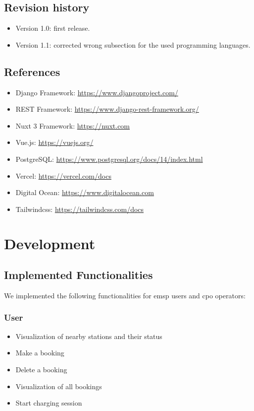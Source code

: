 \documentclass[table, 12pt]{article}
\begin{document}
\subsection{Revision history}
\begin{itemize}
    \item Version 1.0: first release.
    \item Version 1.1: corrected wrong subsection for the used programming languages.
    
\end{itemize}

\subsection{References}
\begin{itemize}
    \item Django Framework: \url{https://www.djangoproject.com/}
    \item REST Framework: \url{https://www.django-rest-framework.org/}
    \item Nuxt 3 Framework: \url{https://nuxt.com}
    \item Vue.js: \url{https://vuejs.org/}
    \item PostgreSQL: \url{https://www.postgresql.org/docs/14/index.html}
    \item Vercel: \url{https://vercel.com/docs}
    \item Digital Ocean: \url{https://www.digitalocean.com}
    \item Tailwindcss: \url{https://tailwindcss.com/docs}
\end{itemize}

\newpage
\section{Development}
\subsection{Implemented Functionalities}
We implemented the following functionalities for emsp users and cpo operators:

\subsubsection*{User}
\begin{itemize}
    \item Visualization of nearby stations and their status
    \item Make a booking
    \item Delete a booking
    \item Visualization of all bookings
    \item Start charging session
\end{itemize}
\end{document}
